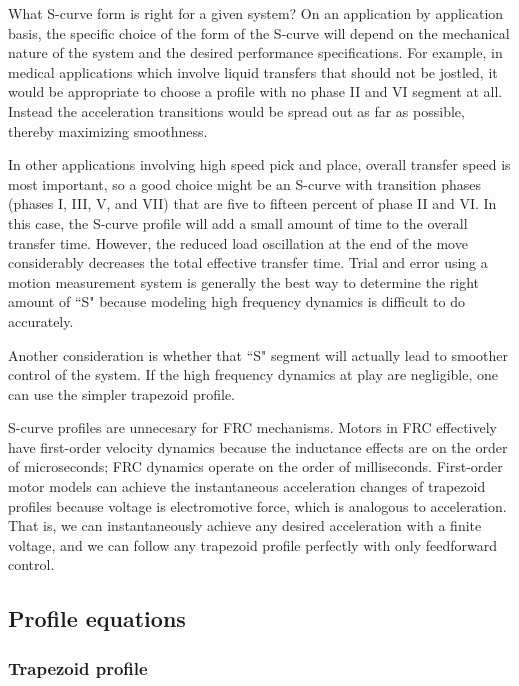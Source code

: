 What S-curve form is right for a given \gls{system}? On an application by
application basis, the specific choice of the form of the S-curve will depend on
the mechanical nature of the \gls{system} and the desired performance
specifications. For example, in medical applications which involve liquid
transfers that should not be jostled, it would be appropriate to choose a
profile with no phase II and VI segment at all. Instead the acceleration
transitions would be spread out as far as possible, thereby maximizing
smoothness.

In other applications involving high speed pick and place, overall transfer
speed is most important, so a good choice might be an S-curve with transition
phases (phases I, III, V, and VII) that are five to fifteen percent of phase II
and VI. In this case, the S-curve profile will add a small amount of time to the
overall transfer time. However, the reduced load oscillation at the end of the
move considerably decreases the total effective transfer time. Trial and error
using a motion measurement system is generally the best way to determine the
right amount of ``S" because modeling high frequency dynamics is difficult to
do accurately.

Another consideration is whether that ``S" segment will actually lead to
smoother control of the \gls{system}. If the high frequency dynamics at play are
negligible, one can use the simpler trapezoid profile.
\begin{remark}
  S-curve profiles are unnecesary for FRC mechanisms. Motors in FRC effectively
  have first-order velocity dynamics because the inductance effects are on the
  order of microseconds; FRC dynamics operate on the order of milliseconds.
  First-order motor models can achieve the instantaneous acceleration changes of
  trapezoid profiles because voltage is electromotive force, which is analogous
  to acceleration. That is, we can instantaneously achieve any desired
  acceleration with a finite voltage, and we can follow any trapezoid profile
  perfectly with only feedforward control.
\end{remark}

\subsection{Profile equations}

\subsubsection{Trapezoid profile}

